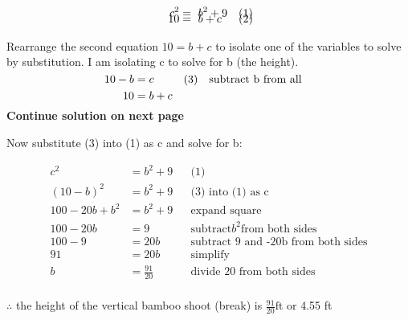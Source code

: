 \documentclass[12pt]{book}
\begin{document}
\begin{enumerate}
\vspace{-1.5em}
\begin{align*}
    \text{\space} c^2 & = \text{\space} b^2 + 9 && (1)\\[-1em]
    \text{\space} 10 & = \text{\space} b + c && (2)
\end{align*}

Rearrange the second equation $10 = b + c$ to isolate one of the variables to solve by substitution. I am isolating c to solve for b (the height).

\begin{align*}
    10 & = b + c \\
    \\[-4.5em]
    10 - b & = c && \text{(3) \space \space subtract b from all}
\end{align*}

\vspace{0.2em}
\begin{center}
    \textbf{Continue solution on next page}\\
\end{center}

\newpage

\vspace{0.2cm}
\begin{center}
    Now substitute (3) into (1) as c and solve for b:
\end{center}

\vspace{-2em}
\begin{align*}
    c^2 & = b^2 + 9 && \text{(1)} \\
    (10 - b)^2 & = b^2 + 9 && \text{(3) into (1) as c} \\
    100 -20b + b^2 & = b^2 + 9 && \text{expand square} \\
    100 - 20b & = 9 && \text{subtract} b^2 \text{from both sides} \\
    100 - 9 & = 20b && \text{subtract 9 and -20b from both sides} \\
    91 & = 20b && \text{simplify} \\
    b & = \frac{91}{20} && \text{divide 20 from both sides} \\ 
\end{align*}

\vspace{-4em}
\begin{center}
    $\therefore$ the height of the vertical bamboo shoot (break) is $\boxed{\frac{91}{20} \text{ft}}$ or 4.55 ft
\end{center}


\end{enumerate}
\end{document}
